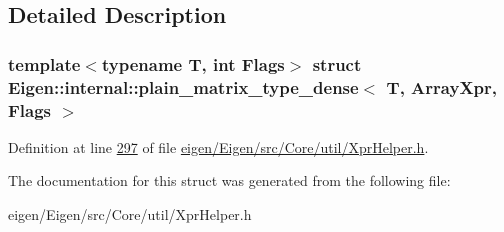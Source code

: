 \subsection{Detailed Description}
\subsubsection*{template$<$typename T, int Flags$>$\newline
struct Eigen\+::internal\+::plain\+\_\+matrix\+\_\+type\+\_\+dense$<$ T, Array\+Xpr, Flags $>$}



Definition at line \hyperlink{eigen_2_eigen_2src_2_core_2util_2_xpr_helper_8h_source_l00297}{297} of file \hyperlink{eigen_2_eigen_2src_2_core_2util_2_xpr_helper_8h_source}{eigen/\+Eigen/src/\+Core/util/\+Xpr\+Helper.\+h}.



The documentation for this struct was generated from the following file\+:\begin{DoxyCompactItemize}
\item 
eigen/\+Eigen/src/\+Core/util/\+Xpr\+Helper.\+h\end{DoxyCompactItemize}
